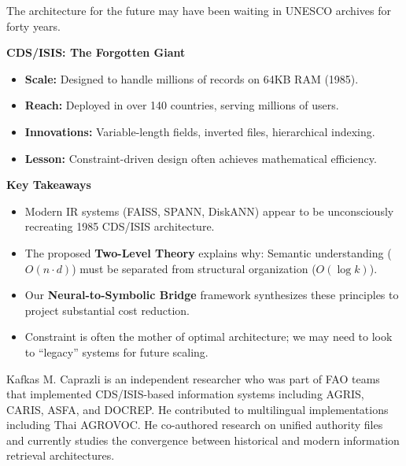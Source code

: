 \documentclass[manuscript,screen,nonacm]{acmart}
\newenvironment{sidebarbox}[1][]{%
  \def\sidebarboxtitle{#1}%
  \begin{oframed}%
  \noindent\textbf{\sidebarboxtitle}\par\smallskip
}{%
  \end{oframed}%
}
\begin{document}
The architecture for the future may have been waiting in UNESCO archives for forty years.

\begin{sidebarbox}[CDS/ISIS: The Forgotten Giant]
\begin{itemize}
    \item \textbf{Scale:} Designed to handle millions of records on 64KB RAM (1985).
    \item \textbf{Reach:} Deployed in over 140 countries, serving millions of users.
    \item \textbf{Innovations:} Variable-length fields, inverted files, hierarchical indexing.
    \item \textbf{Lesson:} Constraint-driven design often achieves mathematical efficiency.
\end{itemize}
\end{sidebarbox}

\begin{sidebarbox}[Key Takeaways]
\begin{itemize}
    \item Modern IR systems (FAISS, SPANN, DiskANN) appear to be unconsciously recreating 1985 CDS/ISIS architecture.
    \item The proposed \textbf{Two-Level Theory} explains why: Semantic understanding ($O(n \cdot d)$) must be separated from structural organization ($O(\log k)$).
    \item Our \textbf{Neural-to-Symbolic Bridge} framework synthesizes these principles to project substantial cost reduction.
    \item Constraint is often the mother of optimal architecture; we may need to look to ``legacy'' systems for future scaling.
\end{itemize}
\end{sidebarbox}




\begin{acks}
Kafkas M. Caprazli is an independent researcher who was part of FAO teams that implemented CDS/ISIS-based information systems including AGRIS, CARIS, ASFA, and DOCREP. He contributed to multilingual implementations including Thai AGROVOC. He co-authored research on unified authority files \cite{caprazli2003} and currently studies the convergence between historical and modern information retrieval architectures.
\end{acks}
\end{document}
